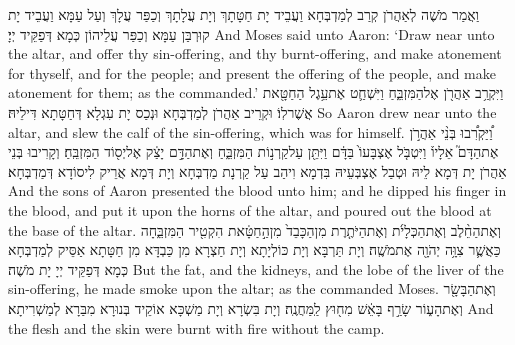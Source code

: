 {וַאֲמַר מֹשֶׁה לְאַהֲרֹן קְרַב לְמַדְבְּחָא וַעֲבֵיד יָת חַטָּתָךְ וְיָת עֲלָתָךְ וְכַפַּר עֲלָךְ וְעַל עַמָּא וַעֲבֵיד יָת קוּרְבַּן עַמָּא וְכַפַּר עֲלֵיהוֹן כְּמָא דְּפַקֵּיד יְיָ׃}
{And Moses said unto Aaron: ‘Draw near unto the altar, and offer thy sin-offering, and thy burnt-offering, and make atonement for thyself, and for the people; and present the offering of the people, and make atonement for them; as the \lord\space commanded.’}{}
{וַיִּקְרַ֥ב אַהֲרֹ֖ן אֶל\maqqaf הַמִּזְבֵּ֑חַ וַיִּשְׁחַ֛ט אֶת\maqqaf עֵ֥גֶל הַחַטָּ֖את אֲשֶׁר\maqqaf לֽוֹ׃}
{וּקְרֵיב אַהֲרֹן לְמַדְבְּחָא וּנְכַס יָת עִגְלָא דְּחַטָּתָא דִּילֵיהּ׃}
{So Aaron drew near unto the altar, and slew the calf of the sin-offering, which was for himself.}{}
{וַ֠יַּקְרִ֠בוּ בְּנֵ֨י אַהֲרֹ֣ן אֶת\maqqaf הַדָּם֮ אֵלָיו֒ וַיִּטְבֹּ֤ל אֶצְבָּעוֹ֙ בַּדָּ֔ם וַיִּתֵּ֖ן עַל\maqqaf קַרְנ֣וֹת הַמִּזְבֵּ֑חַ וְאֶת\maqqaf הַדָּ֣ם יָצַ֔ק אֶל\maqqaf יְס֖וֹד הַמִּזְבֵּֽחַ׃}
{וְקָרִיבוּ בְּנֵי אַהֲרֹן יָת דְּמָא לֵיהּ וּטְבַל אֶצְבְּעֵיהּ בִּדְמָא וִיהַב עַל קַרְנָת מַדְבְּחָא וְיָת דְּמָא אֲרֵיק לִיסוֹדָא דְּמַדְבְּחָא׃}
{And the sons of Aaron presented the blood unto him; and he dipped his finger in the blood, and put it upon the horns of the altar, and poured out the blood at the base of the altar.}{}
{וְאֶת\maqqaf הַחֵ֨לֶב וְאֶת\maqqaf הַכְּלָיֹ֜ת וְאֶת\maqqaf הַיֹּתֶ֤רֶת מִן\maqqaf הַכָּבֵד֙ מִן\maqqaf הַ֣חַטָּ֔את הִקְטִ֖יר הַמִּזְבֵּ֑חָה כַּאֲשֶׁ֛ר צִוָּ֥ה יְהֹוָ֖ה אֶת\maqqaf מֹשֶֽׁה׃}
{וְיָת תַּרְבָּא וְיָת כּוֹלְיָתָא וְיָת חַצְרָא מִן כַּבְדָּא מִן חַטָּתָא אַסֵּיק לְמַדְבְּחָא כְּמָא דְּפַקֵּיד יְיָ יָת מֹשֶׁה׃}
{But the fat, and the kidneys, and the lobe of the liver of the sin-offering, he made smoke upon the altar; as the \lord\space commanded Moses.}{}
{וְאֶת\maqqaf הַבָּשָׂ֖ר וְאֶת\maqqaf הָע֑וֹר שָׂרַ֣ף בָּאֵ֔שׁ מִח֖וּץ לַֽמַּחֲנֶֽה׃}
{וְיָת בִּשְׂרָא וְיָת מַשְׁכָּא אוֹקֵיד בְּנוּרָא מִבַּרָא לְמַשְׁרִיתָא׃}
{And the flesh and the skin were burnt with fire without the camp.}{}
